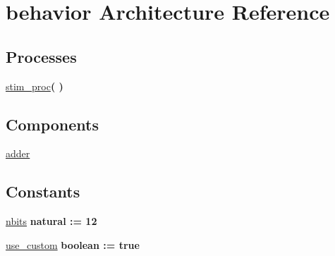 \hypertarget{classtb__adder_1_1behavior}{\section{behavior Architecture Reference}
\label{classtb__adder_1_1behavior}
}
\subsection*{Processes}
 \begin{DoxyCompactItemize}
\item 
\hyperlink{classtb__adder_1_1behavior_ad2efa6785cff833c341e27596b21aeb5}{stim\+\_\+proc}{\bfseries  (  )}
\end{DoxyCompactItemize}
\subsection*{Components}
 \begin{DoxyCompactItemize}
\item 
\hyperlink{classtb__adder_1_1behavior_a9d7a8a381439c61aea549e7a47ec7a6f}{adder}  {\bfseries }  
\end{DoxyCompactItemize}
\subsection*{Constants}
 \begin{DoxyCompactItemize}
\item 
\hyperlink{classtb__adder_1_1behavior_aff8823a253db156c5a7a40d1b813343f}{nbits} {\bfseries \textcolor{vhdlchar}{natural}\textcolor{vhdlchar}{ }\textcolor{vhdlchar}{ }\textcolor{vhdlchar}{\+:}\textcolor{vhdlchar}{=}\textcolor{vhdlchar}{ }\textcolor{vhdlchar}{ } \textcolor{vhdldigit}{12} \textcolor{vhdlchar}{ }} 
\item 
\hyperlink{classtb__adder_1_1behavior_ae53b6cfbb1b5d32c932c417636d6ac3c}{use\+\_\+custom} {\bfseries \textcolor{vhdlchar}{boolean}\textcolor{vhdlchar}{ }\textcolor{vhdlchar}{ }\textcolor{vhdlchar}{\+:}\textcolor{vhdlchar}{=}\textcolor{vhdlchar}{ }\textcolor{vhdlchar}{ }\textcolor{vhdlchar}{ }\textcolor{vhdlchar}{ }\textcolor{vhdlchar}{true}\textcolor{vhdlchar}{ }} 
\end{DoxyCompactItemize}
